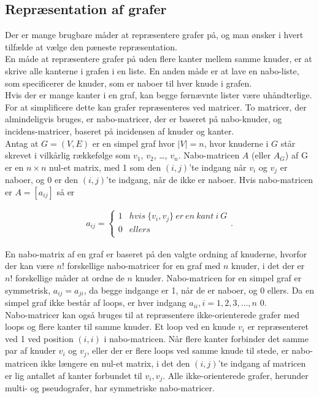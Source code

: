 \subsection{Repræsentation af grafer}

Der er mange brugbare måder at repræsentere grafer på, og man ønsker i hvert tilfælde at vælge den pæneste repræsentation. \\
En måde at repræsentere grafer på uden flere kanter mellem samme knuder, er at skrive alle kanterne i grafen i en liste. En anden måde er at lave en nabo-liste, som specificerer de knuder, som er naboer til hver knude i grafen. \\
Hvis der er mange kanter i en graf, kan begge førnævnte lister være uhåndterlige. For at simplificere dette kan grafer repræsenteres ved matricer. To matricer, der almindeligvis bruges, er nabo-matricer, der er baseret på nabo-knuder, og incidens-matricer, baseret på incidensen af knuder og kanter. \\
Antag at $G=(V,E)$ er en simpel graf hvor $|V|=n$, hvor knuderne i $G$ står skrevet i vilkårlig rækkefølge som $v_1$, $v_2$, \dots , $v_n$. Nabo-matricen $A$ (eller $A_G$) af G er en $n \times n$ nul-et matrix, med 1 som den $(i,j)$’te indgang når $v_i$ og $v_j$ er naboer, og 0 er den $(i,j)$’te indgang, når de ikke er naboer. Hvis nabo-matricen er $A=[a_{ij}]$ så er

\begin{align*}
a_{ij}= \left\{\begin{array}{cc}
1 & hvis \  \lbrace v_i, v_j \rbrace \  er \  en \  kant \  i \  G \\
0 & ellers \\
\end{array}\right.
.
\end{align*}

En nabo-matrix af en graf er baseret på den valgte ordning af knuderne, hvorfor der kan være $n!$ forskellige nabo-matricer for en graf med $n$ knuder, i det der er $n!$ forskellige måder at ordne de $n$ knuder. Nabo-matricen for en simpel graf er symmetrisk, $a_{ij}=a_{ji}$, da begge indgange er 1, når de er naboer, og 0 ellers. Da en simpel graf ikke består af loops, er hver indgang $a_{ii},i=1,2,3, \dots ,n$ $0$. \\
Nabo-matricer kan også bruges til at repræsentere ikke-orienterede grafer med loops og flere kanter til samme knuder. Et loop ved en knude $v_i$ er repræsenteret ved 1 ved position $(i,i)$ i nabo-matricen. Når flere kanter forbinder det samme par af knuder $v_i$ og $v_j$, eller der er flere loops ved samme knude til stede, er nabo-matricen ikke længere en nul-et matrix, i det den $(i,j)$’te indgang af matricen er lig antallet af kanter forbundet til ${v_i,v_j}$. Alle ikke-orienterede grafer, herunder multi- og pseudografer, har symmetriske nabo-matricer. 

